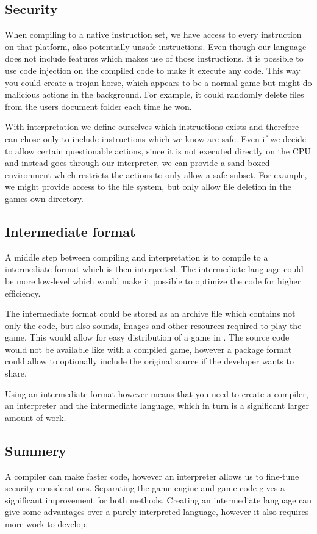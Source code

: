 \subsection{Security}
When compiling to a native instruction set, we have access to every instruction on that platform, also potentially unsafe instructions.
Even though our language does not include features which makes use of those instructions, it is possible to use code injection on the compiled code to make it execute any code.
This way you could create a trojan horse, which appears to be a normal game but might do malicious actions in the background.
For example, it could randomly delete files from the users document folder each time he won.

With interpretation we define ourselves which instructions exists and therefore can chose only to include instructions which we know are safe.
Even if we decide to allow certain questionable actions, since it is not executed directly on the CPU and instead goes through our interpreter, we can provide a sand-boxed environment which restricts the actions to only allow a safe subset. 
For example, we might provide access to the file system, but only allow file deletion in the games own directory.

\subsection{Intermediate format}
A middle step between compiling and interpretation is to compile to a intermediate format which is then interpreted. 
The intermediate language could be more low-level which would make it possible to optimize the code for higher efficiency.

The intermediate format could be stored as an archive file which contains not only the code, but also sounds, images and other resources required to play the game.
This would allow for easy distribution of a game in \productname{}.
The source code would not be available like with a compiled game, however a package format could allow to optionally include the original source if the developer wants to share.

Using an intermediate format however means that you need to create a compiler, an interpreter and the intermediate language, which in turn is a significant larger amount of work.

\subsection{Summery}
A compiler can make faster code, however an interpreter allows us to fine-tune security considerations. 
Separating the game engine and game code gives a significant improvement for both methods.
Creating an intermediate language can give some advantages over a purely interpreted language, however it also requires more work to develop.
